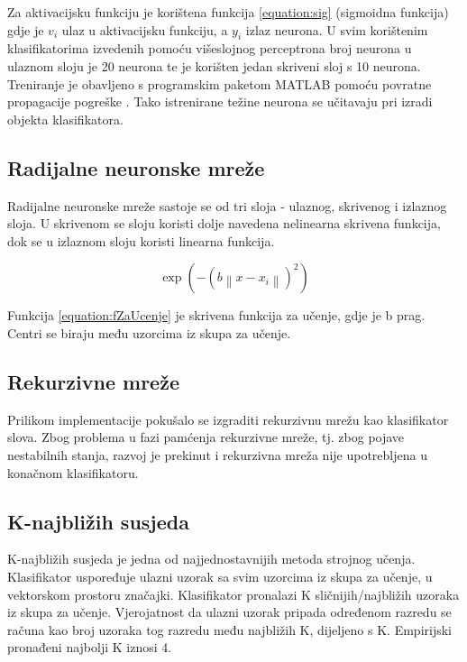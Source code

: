 \documentclass[a4paper,twocolumn,dvipdfm]{article}
\begin{document}
Za aktivacijsku funkciju je korištena funkcija \ref{equation:sig} (sigmoidna
funkcija) gdje je $v_i$ ulaz u aktivacijsku funkciju, a $y_i$ izlaz neurona. U
svim korištenim klasifikatorima izvedenih pomoću višeslojnog perceptrona broj
neurona u ulaznom sloju je 20 neurona te je korišten jedan skriveni sloj s 10
neurona. Treniranje je obavljeno s programskim paketom MATLAB pomoću povratne
propagacije pogreške \cite{rumelhart1986learning}. Tako istrenirane težine
neurona se učitavaju pri izradi objekta klasifikatora.

\subsection{Radijalne neuronske mreže}
Radijalne neuronske mreže sastoje se od tri sloja - ulaznog, skrivenog i
izlaznog sloja. U skrivenom se sloju koristi dolje navedena nelinearna skrivena
funkcija, dok se u izlaznom sloju koristi linearna funkcija.

\begin{equation}
\exp(-\left (b \left \| x - x_{i} \right \|  \right )^{2})
\label{equation:fZaUcenje}
\end{equation}

Funkcija \ref{equation:fZaUcenje} je skrivena funkcija za učenje, gdje je b
prag. Centri se biraju među uzorcima iz skupa za učenje.




\subsection{Rekurzivne mreže}
Prilikom implementacije pokušalo se izgraditi rekurzivnu mrežu kao klasifikator slova. 
Zbog problema u fazi pamćenja rekurzivne mreže, tj. zbog pojave nestabilnih stanja, 
razvoj je prekinut i rekurzivna mreža nije upotrebljena u konačnom klasifikatoru.

\subsection{K-najbližih susjeda}
K-najbližih susjeda je jedna od najjednostavnijih metoda strojnog učenja. 
Klasifikator uspoređuje ulazni uzorak sa svim uzorcima iz skupa za učenje, 
u vektorskom prostoru značajki. Klasifikator pronalazi K sličnijih/najbližih 
uzoraka iz skupa za učenje. Vjerojatnost da ulazni uzorak pripada određenom 
razredu se računa kao broj uzoraka tog razredu među najbližih K, dijeljeno s K. 
Empirijski pronađeni najbolji K iznosi 4.
\end{document}
